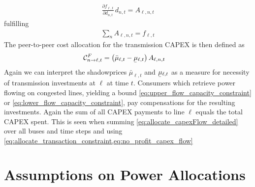 \documentclass[11pt,twocolumn]{article}
\newcommand{\ubar}[1]{\underaccent{\bar}{#1}}
\newcommand{\pdv}[2]{\frac{\partial #1}{\partial #2}}
\newcommand{\demand}[1][n]{d_{#1,t}}
\newcommand{\slackk}[1][n]{k^*_{#1}}
\newcommand{\mulowerflow}{\ubar{\mu}_{\ell,t}}
\newcommand{\muupperflow}{\bar{\mu}_{\ell,t}}
\newcommand{\flow}{f_{\ell,t}}
\newcommand{\allocateFlow}[1][n]{A_{\ell,#1,t}}
\newcommand{\allocateCapexFlow}[1][n]{\mathcal{C}^{F}_{#1,t}}
\begin{document}
\begin{align}
 \pdv{\flow}{\demand}\, \demand = \allocateFlow
\end{align}
fulfilling 
\begin{align}
\sum_{n} \allocateFlow = \flow 
\label{eq:allocate_transaction_constraint}
\end{align}
% 
The peer-to-peer cost allocation for the transmission CAPEX is then defined as 
\begin{align}
 \allocateCapexFlow[n \rightarrow \ell] &=  
\left( \muupperflow - \mulowerflow\right)  \allocateFlow
\label{eq:allocate_capexFlow_detailed}
\end{align}
% 
Again we can interpret the shadowprices $\muupperflow$ and $\mulowerflow$ as a measure for necessity of transmission investments at $\ell$ at time $t$. Consumers which retrieve power flowing on congested lines, yielding a bound \cref{eq:upper_flow_capacity_constraint} or \eqref{eq:lower_flow_capacity_constraint}, pay compensations for the resulting investments. Again the sum of all CAPEX payments to line $\ell$ equals the total CAPEX spent. This is seen when summing \cref{eq:allocate_capexFlow_detailed} over all buses and time steps and using \cref{eq:allocate_transaction_constraint,eq:no_profit_capex_flow}
 


\section{Assumptions on Power Allocations}
\label{sec:localizing_allocations}
\end{document}
